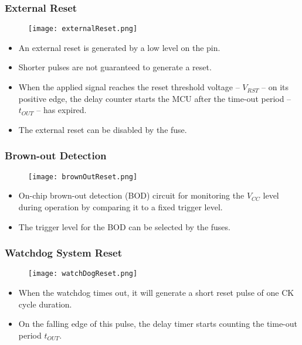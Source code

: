 \documentclass{article}
\begin{document}
\subsubsection{External Reset}
\begin{figure}[H]
    \begin{center}
        \texttt{[image: externalReset.png]}
    \end{center}
\end{figure}
\begin{itemize}
    \item An external reset is generated by a low level on the   pin.
    \item Shorter pulses are not guaranteed to generate a reset.
    \item When the applied signal reaches the reset threshold voltage – $V_{RST}$ – on its positive edge, the delay counter starts the MCU after the time-out period – $t_{OUT}$ – has expired.
    \item The external reset can be disabled by the  fuse.
\end{itemize}

\subsubsection{Brown-out Detection}
\begin{figure}[H]
    \begin{center}
        \texttt{[image: brownOutReset.png]}
    \end{center}
\end{figure}
\begin{itemize}
    \item On-chip brown-out detection (BOD) circuit for monitoring the $V_{CC}$ level during operation by comparing it to a fixed trigger level.
    \item The trigger level for the BOD can be selected by the  fuses.
\end{itemize}

\subsubsection{Watchdog System Reset}
\begin{figure}[H]
    \begin{center}
        \texttt{[image: watchDogReset.png]}
    \end{center}
\end{figure}
\begin{itemize}
    \item When the watchdog times out, it will generate a short reset pulse of one CK cycle duration.
    \item On the falling edge of this pulse,
          the delay timer starts counting the time-out period $t_{OUT}$.
\end{itemize}
\end{document}
